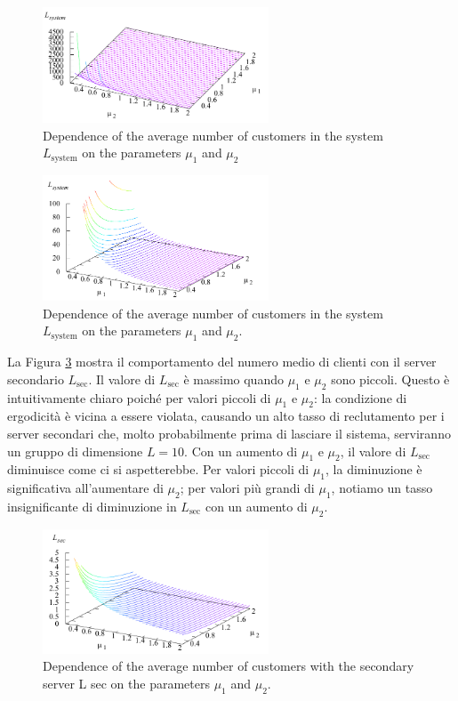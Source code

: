 \documentclass[11pt]{article}
\begin{document}
\begin{figure}[h]
    \centering
    \includegraphics[width=0.6\textwidth]{9LBRzWR.png}
    \caption{Dependence of the average number of customers in the system $L_\mathrm{system}$ on the parameters
    $\mu_1$ and $\mu_2$}
    \label{fig:9}
\end{figure}

\begin{figure}[h]
    \centering
    \includegraphics[width=0.6\textwidth]{CBOSr9C.png}
    \caption{Dependence of the average number of customers in the system $L_\mathrm{system}$ on the parameters
    $\mu_1$ and $\mu_2$.}
    \label{fig:10}
\end{figure}

La Figura \ref{fig:11} mostra il comportamento del numero medio di clienti con il server
secondario $L_\mathrm{sec}$. Il valore di $L_\mathrm{sec}$ è massimo quando $\mu_1$ e $\mu_2$ sono piccoli. Questo è intuitivamente chiaro poiché per valori piccoli di $\mu_1$ e $\mu_2$: la condizione di ergodicità è vicina a essere violata, causando un alto tasso di reclutamento per i server secondari che, molto probabilmente prima di lasciare il sistema, serviranno un gruppo di dimensione $L = 10$. Con un aumento di $\mu_1$ e $\mu_2$, il valore di $L_\mathrm{sec}$ diminuisce come ci si aspetterebbe. Per valori piccoli di $\mu_1$, la diminuzione è significativa all'aumentare di $\mu_2$; per valori più grandi di $\mu_1$, notiamo un tasso insignificante di diminuzione in $L_\mathrm{sec}$ con un aumento di $\mu_2$.

\begin{figure}[h]
    \centering
    \includegraphics[width=0.6\textwidth]{R1VGHAR.png}
    \caption{Dependence of the average number of customers with the secondary server L sec on the
    parameters $\mu_1$ and $\mu_2$.}
    \label{fig:11}
\end{figure}
\end{document}
